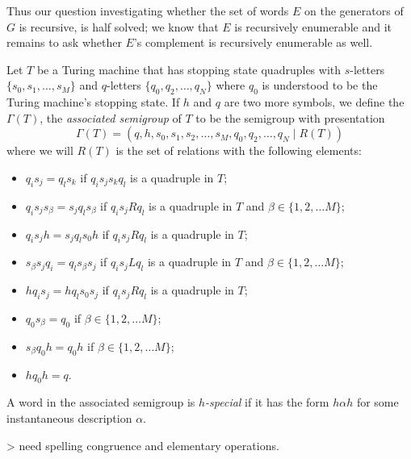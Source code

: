 Thus our question investigating whether the set of words $E$ on the generators of $G$ is recursive, is half solved; we know that $E$ is recursively enumerable and it remains to ask whether $E$'s complement is recursively enumerable as well.

\begin{definition}
  \label{associated-semigroup}
  Let $T$ be a Turing machine that has stopping state quadruples with $s$-letters $\{s_0,s_1,\dots,s_M\}$ and $q$-letters $\{q_0,q_2,\dots,q_N\}$ where $q_0$ is understood to be the Turing machine's stopping state. If $h$ and $q$ are two more symbols, we define the $\Gamma(T)$, the \emph{associated semigroup} of $T$ to be the semigroup with presentation
  \begin{equation*}
    \Gamma(T) = (q,h,s_0,s_1,s_2, \dots, s_M, q_0,q_2, \dots, q_N \mid R(T))
  \end{equation*}
  where we will $R(T)$ is the set of relations with the following elements:
  \begin{itemize}
  \item  $q_is_j = q_ls_k$ if  $q_is_js_kq_l$ is a quadruple in $T$;
  \item $q_is_js_\beta = s_jq_ls_\beta$ if $q_is_jRq_l$ is a quadruple in $T$ and $\beta \in \{1,2,\dots M\}$;
  \item $q_is_jh = s_jq_ls_0h$ if $q_is_jRq_l$ is a quadruple in $T$;
  \item $s_\beta s_jq_i = q_ls_\beta s_j$ if $q_is_jLq_l$ is a quadruple in $T$ and $\beta \in \{1,2,\dots M\}$;
  \item $hq_is_j = h q_ls_0s_j$ if $q_is_jRq_l$ is a quadruple in $T$;
  \item $q_0s_\beta = q_0$ if $\beta \in \{1,2,\dots M\}$;
  \item $s_\beta q_0 h = q_0h$ if $\beta \in \{1,2,\dots M\}$;
  \item $hq_0h = q$.
  \end{itemize}
\end{definition}

\begin{definition}
  A word in the associated semigroup is \emph{$h$-special} if it has the form $h\alpha h$ for some  instantaneous description $\alpha$.
\end{definition}

> need spelling congruence and elementary operations.

